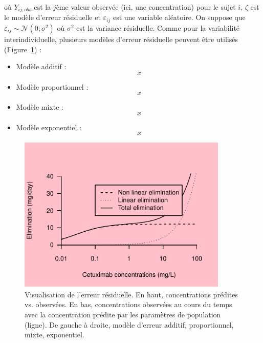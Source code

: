 où $Y_{ij,obs}$ est la $j$ème valeur observée (ici, une concentration) pour le sujet $i$, $\zeta$ est le modèle d'erreur résiduelle et $\varepsilon_{ij}$ est une variable aléatoire. On suppose que $\varepsilon_{ij} \sim \mathcal{N}(0 ; \sigma^2)$ où $\sigma^2$ est la variance résiduelle. Comme pour la variabilité interindividuelle, plusieurs modèles d'erreur résiduelle peuvent être utilisés (Figure~\ref{fig:10}) :
\begin{itemize}
\item Modèle additif :
\begin{equation}
x
\label{eq:50}
\end{equation}

\item Modèle proportionnel :
\begin{equation}
x
\label{eq:51}
\end{equation}

\item Modèle mixte :
\begin{equation}
x
\label{eq:52}
\end{equation}

\item Modèle exponentiel :
\begin{equation}
x
\label{eq:53}
\end{equation}

\end{itemize}

\begin{figure}[htbp]
	\centering
		\includegraphics[width=10cm]{images/essai001.pdf}
	\caption[Visualisation de l'erreur résiduelle.]{Visualisation de l'erreur résiduelle. En haut, concentrations prédites vs. observées. En bas, concentrations observées au cours du temps avec la concentration prédite par les paramètres de population (ligne). De gauche à droite, modèle d'erreur additif, proportionnel, mixte, exponentiel.}
	\label{fig:10}
\end{figure}


